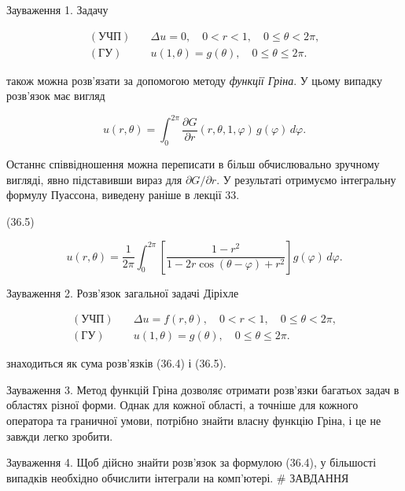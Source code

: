 \documentclass[
  ukrainian,
]{article}
\begin{document}
Зауваження 1. Задачу

\begin{equation*}
\begin{aligned}
(\text{УЧП}) \quad & \Delta u = 0, \quad 0 < r < 1, \quad 0 \leqslant \theta < 2\pi, \\
(\text{ГУ}) \quad & u(1, \theta) = g(\theta), \quad 0 \leqslant \theta \leqslant 2\pi.
\end{aligned}
\end{equation*}

також можна розв'язати за допомогою методу \emph{функції Гріна}. У цьому
випадку розв'язок має вигляд

\begin{equation*}
u(r, \theta) = \int_{0}^{2\pi} \frac{\partial G}{\partial r}(r, \theta, 1, \varphi)\, g(\varphi)\, d\varphi.
\end{equation*}

Останнє співвідношення можна переписати в більш обчислювально зручному
вигляді, явно підставивши вираз для \(\partial G/\partial r\). У
результаті отримуємо інтегральну формулу Пуассона, виведену раніше в
лекції 33.

(36.5)

\begin{equation*}
u(r, \theta) = \frac{1}{2\pi} \int_{0}^{2\pi}
\left[ \frac{1 - r^2}{1 - 2r\cos(\theta - \varphi) + r^2} \right] g(\varphi)\, d\varphi.
\end{equation*}

Зауваження 2. Розв'язок загальної задачі Діріхле

\begin{equation*}
\begin{aligned}
(\text{УЧП}) \quad & \Delta u = f(r, \theta), \quad 0 < r < 1, \quad 0 \le \theta < 2\pi, \\
(\text{ГУ}) \quad & u(1, \theta) = g(\theta), \quad 0 \le \theta \le 2\pi.
\end{aligned}
\end{equation*}

знаходиться як сума розв'язків (36.4) і (36.5).

Зауваження 3. Метод функцій Гріна дозволяє отримати розв'язки багатьох
задач в областях різної форми. Однак для кожної області, а точніше для
кожного оператора та граничної умови, потрібно знайти власну функцію
Гріна, і це не завжди легко зробити.

Зауваження 4. Щоб дійсно знайти розв'язок за формулою (36.4), у
більшості випадків необхідно обчислити інтеграли на комп'ютері. \#
ЗАВДАННЯ
\end{document}
